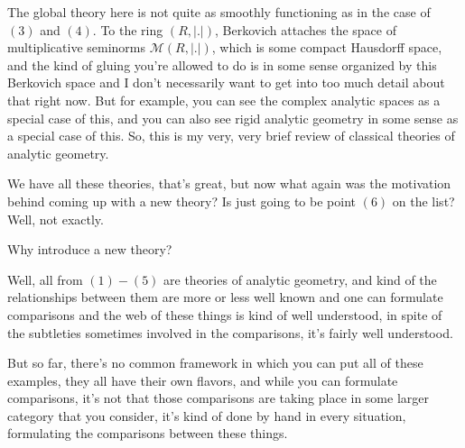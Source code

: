 The global theory here is not quite as smoothly functioning as in the case of $(3)$ and $(4)$. To the ring $(R, |.|)$, Berkovich attaches the space of multiplicative seminorms $\mathcal{M}(R, |.|)$, which is some compact Hausdorff space, and  the kind of gluing you're allowed to do is in some sense organized by this Berkovich space and I don't necessarily want to get into too much detail about that right now. But for example, you can see the complex analytic spaces as a special case of this, and you can also see rigid analytic geometry in some sense as a special case of this. So, this is my very, very brief review of classical theories of analytic geometry.



We have all these theories, that's great, but now what again was the motivation behind coming up with a new theory? Is  just going to be point $(6)$ on the list? Well, not exactly.

\begin{question}
    Why introduce a new theory?
\end{question}

Well, all from $(1) - (5)$ are theories of analytic geometry, and kind of the relationships between them are more or less well known and one can formulate comparisons and the web of these things is kind of well understood, in spite of the subtleties sometimes involved in the comparisons, it's fairly well understood.

But so far, there's no common framework in which you can put all of these examples, they all have their own flavors, and while you can formulate comparisons, it's not that those comparisons are taking place in some larger category that you consider, it's kind of done by hand in every situation, formulating the comparisons between these things.

